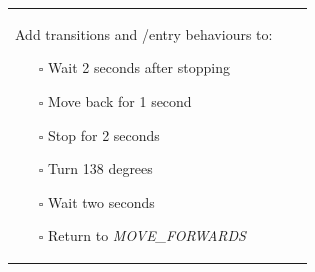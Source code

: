 \documentclass{scrartcl}
\newcommand*{\state}[1]{\textit{#1}}
\begin{document}
\begin{tabular}{l l l}
\begin{minipage}[t]{.3\textwidth}
    Add transitions and /entry behaviours to:
    \begin{itemize}
    \item[$\square$] Wait 2 seconds after stopping
    \item[$\square$] Move back for 1 second
    \item[$\square$] Stop for 2 seconds
    \item[$\square$] Turn 138 degrees
    \item[$\square$] Wait two seconds
    \item[$\square$] Return to \state{MOVE\_FORWARDS}
    \end{itemize}
  \end{minipage}\\
\end{tabular}
\end{document}
